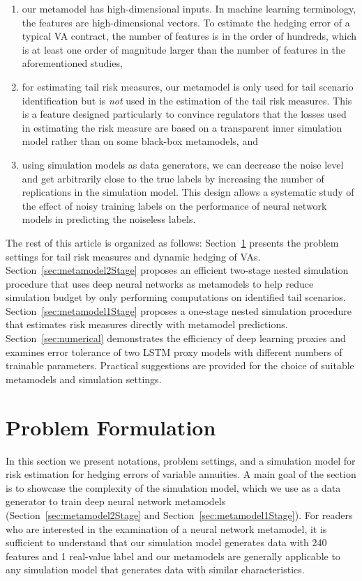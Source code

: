 \documentclass[]{article}
\begin{document}
\begin{enumerate}
    \item  our metamodel has high-dimensional inputs. In machine learning terminology, the features are high-dimensional vectors.
    To estimate the hedging error of a typical VA contract, the number of features is in the order of hundreds, which is at least one order of magnitude larger than the number of features in the aforementioned studies,
    \item  for estimating tail risk measures, our metamodel is only used for tail scenario identification but is \textit{not} used in the estimation of the tail risk measures.
    This is a feature designed particularly to convince regulators that the losses used in estimating the risk measure are based on a transparent inner simulation model rather than on some black-box metamodels, and
    \item  using simulation models as data generators, we can decrease the noise level and get arbitrarily close to the true labels by increasing the number of replications in the simulation model.
    This design allows a systematic study of the effect of noisy training labels on the performance of neural network models in predicting the noiseless labels.
\end{enumerate}

The rest of this article is organized as follows: 
Section~\ref{sec:problem-formulation} presents the problem settings for tail risk measures and dynamic hedging of VAs. 
Section~\ref{sec:metamodel2Stage} proposes an efficient two-stage nested simulation procedure that uses deep neural networks as metamodels to help reduce simulation budget by only performing computations on identified tail scenarios. 
Section~\ref{sec:metamodel1Stage} proposes a one-stage nested simulation procedure that estimates risk measures directly with metamodel predictions.
Section~\ref{sec:numerical} demonstrates the efficiency of deep learning proxies and examines error tolerance of two LSTM proxy models with different numbers of trainable parameters. 
Practical suggestions are provided for the choice of suitable metamodels and simulation settings. 

\section{Problem Formulation} \label{sec:problem-formulation}

In this section we present notations, problem settings, and a simulation model for risk estimation for hedging errors of variable annuities.
A main goal of the section is to showcase the complexity of the simulation model, which we use as a data generator to train deep neural network metamodels (Section~\ref{sec:metamodel2Stage} and Section~\ref{sec:metamodel1Stage}).
For readers who are interested in the examination of a neural network metamodel, it is sufficient to understand that our simulation model generates data with 240 features and 1 real-value label and our metamodels are generally applicable to any simulation model that generates data with similar characteristics.
\end{document}
